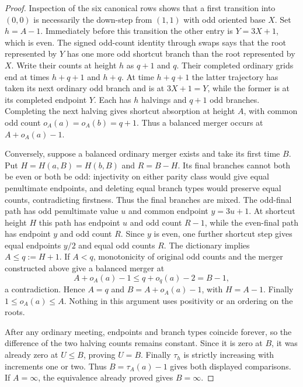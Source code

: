 \documentclass[11pt]{amsart}
\theoremstyle{definition}
\theoremstyle{remark}
\begin{document}
\begin{proof}
Inspection of the six canonical rows shows that a first transition into
$(0,0)$ is necessarily the down-step from $(1,1)$ with odd oriented base
$X$. Set $h=A-1$. Immediately before this transition the other entry is
$Y=3X+1$, which is even. The signed odd-count identity through swaps says
that the root represented by $Y$ has one more odd shortcut branch than
the root represented by $X$. Write their counts at height $h$ as $q+1$
and $q$. Their completed ordinary grids end at times $h+q+1$ and $h+q$.
At time $h+q+1$ the latter trajectory has taken its next ordinary odd
branch and is at $3X+1=Y$, while the former is at its completed endpoint
$Y$. Each has $h$ halvings and $q+1$ odd branches. Completing the next
halving gives shortcut absorption at height $A$, with common odd count
$o_A(a)=o_A(b)=q+1$. Thus a balanced merger occurs at $A+o_A(a)-1$.

Conversely, suppose a balanced ordinary merger exists and take its first
time $B$. Put $H=H(a,B)=H(b,B)$ and $R=B-H$. Its final branches cannot
both be even or both be odd: injectivity on either parity class would
give equal penultimate endpoints, and deleting equal branch types would
preserve equal counts, contradicting firstness. Thus the final branches
are mixed. The odd-final path has odd penultimate value $u$ and common
endpoint $y=3u+1$. At shortcut height $H$ this path has endpoint $u$ and
odd count $R-1$, while the even-final path has endpoint $y$ and odd count
$R$. Since $y$ is even, one further shortcut step gives equal endpoints
$y/2$ and equal odd counts $R$. The dictionary implies $A\le q:=H+1$.
If $A<q$, monotonicity of original odd counts and the merger constructed
above give a balanced merger at
\[
 A+o_A(a)-1\le q+o_q(a)-2=B-1,
\]
a contradiction. Hence $A=q$ and $B=A+o_A(a)-1$, with $H=A-1$.
Finally $1\le o_A(a)\le A$. Nothing in this argument uses positivity
or an ordering on the roots.

After any ordinary meeting, endpoints and branch types coincide forever,
so the difference of the two halving counts remains constant. Since it
is zero at $B$, it was already zero at $U\le B$, proving $U=B$.
Finally $\tau_h$ is strictly increasing with increments one or two.
Thus $B=\tau_A(a)-1$ gives both displayed comparisons. If $A=\infty$,
the equivalence already proved gives $B=\infty$.
\end{proof}
\end{document}
